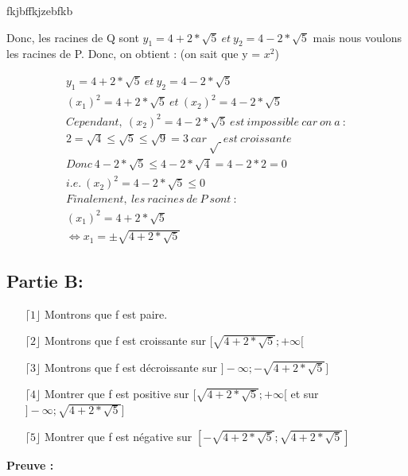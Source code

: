fkjbffkjzebfkb\documentclass[a4paper, 12pt]{article}
\begin{document}
Donc, les racines de Q sont \( y_1 = 4 + 2 * \sqrt{5} ~ et ~ y_2 = 4 - 2 * \sqrt{5}  \) mais nous voulons les racines de P. Donc, on obtient : (on sait que y = $x^2$)


\begin{align*}
	y_1 = 4 + 2 * \sqrt{5} ~ et ~ y_2 = 4 - 2 * \sqrt{5} \\
	(x_1)^2 = 4 + 2 * \sqrt{5} ~ et ~ (x_2)^2 = 4 - 2 * \sqrt{5} \\
	Cependant, ~ (x_2)^2 = 4 - 2 * \sqrt{5} ~ est ~ impossible ~ car ~ on ~ a ~ : \\
	2 = \sqrt{4} \leq \sqrt{5} \leq \sqrt{9} = 3 ~ car ~ \surd ~ est ~ croissante \\
	Donc ~ 4 - 2 * \sqrt{5} \leq 4 - 2 * \sqrt{4} = 4 - 2 * 2 = 0 \\
	i.e. ~ (x_2)^2 = 4 - 2 * \sqrt{5} \leq 0 ~~~~~~~~~~~~~~~~~~~~~~~~~ \\
	Finalement, ~ les ~ racines ~ de ~ P ~ sont ~ : \\
	(x_1)^2 = 4 + 2 * \sqrt{5} \\
	\Leftrightarrow x_1 = \pm \sqrt{4 + 2 * \sqrt{5}}	
\end{align*}


\newpage
\subsection{Partie B:}

\begin{itemize}
	\item[\(\lceil 1 \rfloor\)] Montrons que f est paire.
	\item[\(\lceil 2 \rfloor\)] Montrons que f est croissante sur \( [ \sqrt{4 + 2 * \sqrt{5}} ; +\infty [ \)
	\item[\(\lceil 3 \rfloor\)] Montrons que f est décroissante sur \( ] -\infty ; -\sqrt{4 + 2 * \sqrt{5}} ] \)
	\item[\(\lceil 4 \rfloor\)] Montrer que f est positive sur \( [ \sqrt{4 + 2 * \sqrt{5}} ; +\infty [ \) et sur \( ] -\infty ; \sqrt{4 + 2 * \sqrt{5}} ] \)
	\item[\(\lceil 5 \rfloor\)] Montrer que f est négative sur \( [ -\sqrt{4 + 2 * \sqrt{5}} ; \sqrt{4 + 2 * \sqrt{5}} ] \)
\end{itemize}

\textbf{Preuve :}
\end{document}
